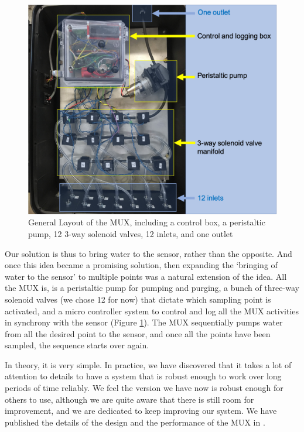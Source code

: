 \documentclass[]{book}
\begin{document}
\begin{figure}

{\centering \includegraphics[width=0.8\linewidth]{pictures/MUXLayout} 

}

\caption{General Layout of the MUX, including a control box, a peristaltic pump, 12 3-way solenoid valves, 12 inlets, and one outlet}\label{fig:MUXLayout}
\end{figure}

Our solution is thus to bring water to the sensor, rather than the opposite. And once this idea became a promising solution, then expanding the `bringing of water to the sensor' to multiple points was a natural extension of the idea. All the MUX is, is a peristaltic pump for pumping and purging, a bunch of three-way solenoid valves (we chose 12 for now) that dictate which sampling point is activated, and a micro controller system to control and log all the MUX activities in synchrony with the sensor (Figure \ref{fig:MUXLayout}). The MUX sequentially pumps water from all the desired point to the sensor, and once all the points have been sampled, the sequence starts over again.

In theory, it is very simple. In practice, we have discovered that it takes a lot of attention to details to have a system that is robust enough to work over long periods of time reliably. We feel the version we have now is robust enough for others to use, although we are quite aware that there is still room for improvement, and we are dedicated to keep improving our system. We have published the details of the design and the performance of the MUX in \citeyearpar{Birgand2016-to}.
\end{document}
